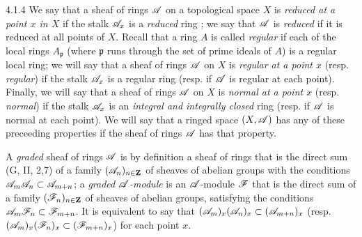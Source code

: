 \begin{env}{4.1.4}
\label{env-0.4.1.4}
We say that a sheaf of rings $\mathscr{A}$ on a topological space $X$ is \emph{reduced at a point
$x$ in $X$} if the stalk $\mathscr{A}_x$ is a \emph{reduced} ring ; we say that
$\mathscr{A}$ is \emph{reduced} if it is reduced at all points of $X$. Recall that a ring $A$ is
called \emph{regular} if each of the local rings $A_\mathfrak{p}$ (where $\mathfrak{p}$ runs
through the set of prime ideals of $A$) is a regular local ring; we will say that a sheaf of
rings $\mathscr{A}$ on $X$ is \emph{regular at a point $x$} (resp. \emph{regular}) if the stalk
$\mathscr{A}_x$ is a regular ring (resp. if $\mathscr{A}$ is regular at each point). Finally, we will
say that a sheaf of rings $\mathscr{A}$ on $X$ is \emph{normal at a point $x$} (resp.
\emph{normal}) if the stalk $\mathscr{A}_x$ is an \emph{integral and integrally closed} ring
(resp. if $\mathscr{A}$ is normal at each point). We will say that a ringed space $(X,\mathscr{A})$ has
any of these preceeding properties if the sheaf of rings $\mathscr{A}$ has that property.

A \emph{graded} sheaf of rings $\mathscr{A}$ is by definition a sheaf of rings that is the direct
sum (G, II, 2,7) of a family $(\mathscr{A}_n)_{n\in\mathbf{Z}}$ of sheaves of abelian groups with the
conditions $\mathscr{A}_m\mathscr{A}_n\subset\mathscr{A}_{m+n}$; a \emph{graded $\mathscr{A}$-module} is an
$\mathscr{A}$-module $\mathscr{F}$ that is the direct sum of a family $(\mathscr{F}_n)_{n\in\mathbf{Z}}$ of
sheaves of abelian groups, satisfying the conditions $\mathscr{A}_m\mathscr{F}_n\subset\mathscr{F}_{m+n}$.
It is equivalent to say that $(\mathscr{A}_m)_x(\mathscr{A}_n)_x\subset(\mathscr{A}_{m+n})_x$ (resp.
$(\mathscr{A}_m)_x(\mathscr{F}_n)_x\subset(\mathscr{F}_{m+n})_x$) for each point $x$.
\end{env}

